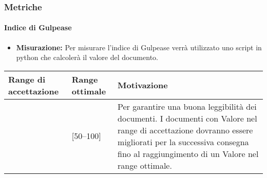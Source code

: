 \subsubsection{Metriche}

\paragraph{Indice di Gulpease}

\begin{itemize}
\item \textbf{Misurazione:} Per misurare l'indice di Gulpease verrà utilizzato uno script in python che calcolerà il valore del documento.
\end{itemize}

\begin{center}

		\begin{tabular}{|P{2.5cm}|P{2.5cm}|P{6cm}|}
		\hline
			\textbf{Range di accettazione}	& \textbf{Range ottimale} & \textbf{Motivazione} \\
			\hline
			[40 -- 100] & [50--100] &	Per garantire una buona leggibilità dei documenti. I documenti con Valore nel range di accettazione dovranno essere migliorati per la successiva consegna fino al raggiungimento di un Valore nel range ottimale. \\
			\hline
			\end{tabular}
\end{center}